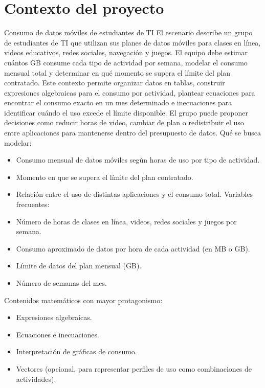 \documentclass[12pt,a4paper]{article}
\begin{document}
	\section{Contexto del proyecto}
	
	Consumo de datos móviles de estudiantes de TI El escenario describe un grupo de estudiantes de TI que utilizan sus planes de datos móviles para clases en línea, videos educativos, redes sociales, navegación y juegos. El equipo debe estimar cuántos GB consume cada tipo de actividad por semana, modelar el consumo mensual total y determinar en qué momento se supera el límite del plan contratado. Este contexto permite organizar datos en tablas, construir expresiones algebraicas para el consumo por actividad, plantear ecuaciones para encontrar el consumo exacto en un mes determinado e inecuaciones para identificar cuándo el uso excede el límite disponible. El grupo puede proponer decisiones como reducir horas de video, cambiar de plan o redistribuir el uso entre aplicaciones para mantenerse dentro del presupuesto de datos. Qué se busca modelar: 
	
	\begin{itemize}
		\item  Consumo mensual de datos móviles según horas de uso por tipo de actividad.
		\item Momento en que se supera el límite del plan contratado.
		\item Relación entre el uso de distintas aplicaciones y el consumo total. Variables frecuentes:
		\item Número de horas de clases en línea, videos, redes sociales y juegos por semana.
		\item Consumo aproximado de datos por hora de cada actividad (en MB o GB).
		\item Límite de datos del plan mensual (GB).
		\item Número de semanas del mes.
	\end{itemize}
	 Contenidos matemáticos con mayor protagonismo:
	 \begin{itemize}
		 \item Expresiones algebraicas.
		 \item Ecuaciones e inecuaciones.
		 \item Interpretación de gráficas de consumo.
		 \item Vectores (opcional, para representar perfiles de uso como combinaciones de actividades).
	\end{itemize}
	
\end{document}
